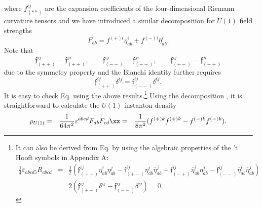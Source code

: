\documentclass[12pt,epsf]{article}
\begin{document}
where $ f^{ij}_{(**)}$ are the expansion coefficients of the four-dimensional Riemann curvature tensors 
and we have introduced a similar decomposition for $U(1)$ field strengths
\begin{equation}\label{decom-fab}
  F_{ab} = f^{(+)i} \eta^i_{ab} + f^{(-)i}\bar{\eta}^i_{ab}.
\end{equation}
Note that
\begin{equation}\label{symm-fs}
\mathfrak{f}^{ij}_{(++)} = \mathfrak{f}^{ji}_{(++)}, \qquad   \mathfrak{f}^{ij}_{(--)} = \mathfrak{f}^{ji}_{(--)}, \qquad \mathfrak{f}^{ij}_{(+-)} = \mathfrak{f}^{ji}_{(-+)}
\end{equation}
due to the symmetry property  and the Bianchi identity  further requires
\begin{equation}\label{eq-trace}
  \mathfrak{f}^{ij}_{(++)} \delta^{ij} = \mathfrak{f}^{ij}_{(--)} \delta^{ij}.
\end{equation}
It is easy to check Eq.  using the above results.\footnote{It can also be derived from Eq. 
by using the algebraic properties of the 't Hooft symbols in Appendix A:
\begin{eqnarray*}
\frac{1}{4} \varepsilon_{abcd5} R_{abcd} &=& \frac{1}{2} \left( \mathfrak{f}^{ij}_{(++)} \eta^i_{ab} \eta^j_{ab}
- \mathfrak{f}^{ij}_{(+-)} \eta^i_{ab} \bar{\eta}^j_{ab}
  + \mathfrak{f}^{ij}_{(-+)}\bar{\eta}^i_{ab} \eta^j_{ab} - \mathfrak{f}^{ij}_{(--)} \bar{\eta}^i_{ab} \bar{\eta}^j_{ab} \right) \\
  &=& 2 \left( \mathfrak{f}^{ij}_{(++)} \delta^{ij}
  - \mathfrak{f}^{ij}_{(--)} \delta^{ij} \right)=0.
\end{eqnarray*}
}
Using the decomposition , it is straightforward to calculate the $U(1)$ instanton density
\begin{eqnarray}\label{u1-idensity}
  \rho_{U(1)} &=& \frac{1}{64 \pi^2} \varepsilon^{abcd} F_{ab} F_{cd} \xx
  &=& \frac{1}{8 \pi^2} (f^{(+)k} f^{(+)k}- f^{(-)k} f^{(-)k}).
\end{eqnarray}
\end{document}
